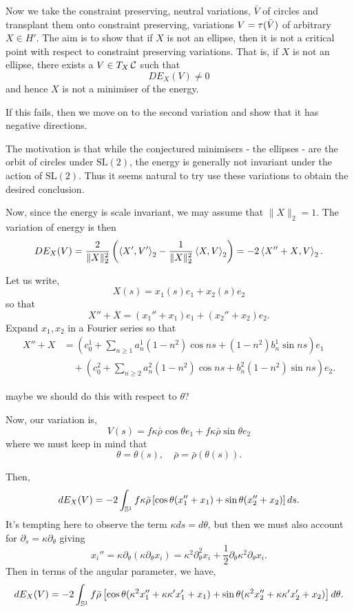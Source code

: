 \documentclass[12pt]{article}
\begin{document}
Now we take the constraint preserving, neutral variations, \(\bar{V}\) of circles and transplant them onto constraint preserving, variations \(V = \operatorname{\tau}(\bar{V})\) of arbitrary \(X \in H'\). The aim is to show that if \(X\) is not an ellipse, then it is not a critical point with respect to constraint preserving variations. That is, if \(X\) is not an ellipse, there exists a \(V \in T_X \operatorname{\mathcal{C}}\) such that
\[
DE_X (V) \ne 0
\]
and hence \(X\) is not a minimiser of the energy.

{\color{red} If this fails, then we move on to the second variation and show that it has negative directions.}

The motivation is that while the conjectured minimisers - the ellipses - are the orbit of circles under \(\text{SL}(2)\), the energy is generally not invariant under the action of \(\text{SL}(2)\). Thus it seems natural to try use these variations to obtain the desired conclusion.

Now, since the energy is scale invariant, we may assume that \(\|X\|_2 = 1\). The variation of energy is then
\[
DE_X (V) = \frac{2}{\|X\|_2^2} \left(\left\langle{X'},{V'}\right\rangle_2 - \frac{1}{\|X\|_2^2}\left\langle{X},{V}\right\rangle_2\right) = -2 \left\langle{X'' + X},{V}\right\rangle_2.
\]

Let us write,
\[
X(s) = x_1(s) e_1 + x_2(s) e_2
\]
so that
\[
X'' + X = (x_1'' + x_1)e_1 + (x_2'' + x_2)e_2.
\]
Expand \(x_1, x_2\) in a Fourier series so that
\[
\begin{split}
X'' + X &= (c_0^1 + \sum_{n\geq 1} a_n^1 (1-n^2)\cos ns + (1-n^2)b_n^1 \sin ns) e_1 \\
&\quad + (c_0^2 + \sum_{n\geq 2} a_n^2 (1-n^2)\cos ns + b_n^2 (1-n^2) \sin ns) e_2.
\end{split}
\]

{\color{red} maybe we should do this with respect to \(\theta\)?}

Now, our variation is,
\[
V(s) = f\kappa\bar{\rho} \cos\theta e_1 + f\kappa\bar{\rho} \sin\theta e_2
\]
where we must keep in mind that
\[
\theta = \theta(s), \quad \bar{\rho} = \bar{\rho}(\theta(s)).
\]

Then,
\[
dE_X (V) = -2 \int_{\operatorname{\mathbb{S}^1}} f\kappa\bar{\rho} \left[\cos\theta (x_1'' + x_1) + \sin\theta (x_2'' + x_2) \right] ds.
\]
It's tempting here to observe the term \(\kappa ds = d\theta\), but then we must also account for \(\partial_s = \kappa \partial_{\theta}\) giving
\[
x_i'' = \kappa \partial_{\theta} (\kappa \partial_\theta x_i) = \kappa^2 \partial_{\theta}^2 x_i + \frac{1}{2} \partial_{\theta} \kappa^2 \partial_{\theta} x_i.
\]
Then in terms of the angular parameter, we have,
\[
dE_X (V) = -2 \int_{\operatorname{\mathbb{S}^1}} f \bar{\rho} \left[\cos\theta (\kappa^2 x_1'' + \kappa\kappa' x_1 ' + x_1) + \sin\theta (\kappa^2 x_2'' + \kappa\kappa' x_2 ' + x_2) \right] d\theta.
\]
\end{document}
